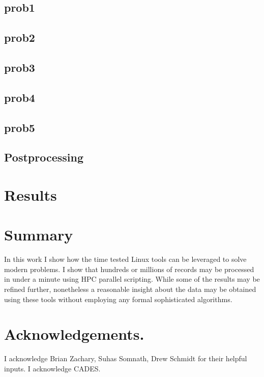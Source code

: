 \documentclass{report}
\begin{document}
\subsection*{prob1}

\subsection*{prob2}

\subsection*{prob3}

\subsection*{prob4}

\subsection*{prob5}

\subsection*{Postprocessing}

\section*{Results}

\section*{Summary}
In this work I show how the time tested Linux tools can be leveraged to solve
modern problems. I show that hundreds or millions of records may be processed
in under a minute using HPC parallel scripting. While some of the results may
be refined further, nonetheless a reasonable insight about the data may be
obtained using these tools without employing any formal sophisticated
algorithms.

\section*{Acknowledgements.}
I acknowledge Brian Zachary, Suhas Somnath, Drew Schmidt for their helpful
inputs. I acknowledge CADES.
\end{document}
